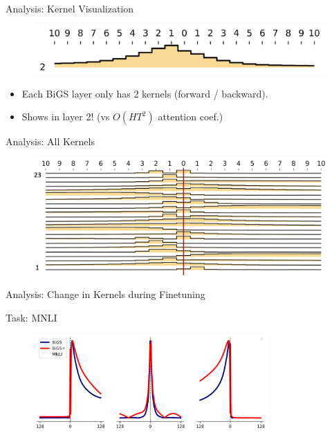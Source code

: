 \documentclass[14pt,aspectratio=169]{beamer}
\begin{document}
\begin{frame}{Analysis: Kernel Visualization}


\begin{figure}
    \centering
    \includegraphics[width=\textwidth]{Figs/kernel1.png}
\end{figure}

\begin{itemize}
    \item Each BiGS layer only has 2 kernels (forward / backward). 
    \item Shows  in layer 2! (vs $O(HT^2)$ attention coef.)
\end{itemize}
\end{frame}

\begin{frame}{Analysis: All Kernels}
\begin{figure}
    \centering
    \includegraphics[height=0.6\textheight]{Figs/kernel2.png}
\end{figure}
\end{frame}

\begin{frame}{Analysis: Change in Kernels during Finetuning }

\centerline{Task: MNLI}
\begin{figure}
    \centering
\includegraphics[width=0.8\textwidth]{Figs/comparison_results.png}
    \end{figure}
\end{frame}
\end{document}
